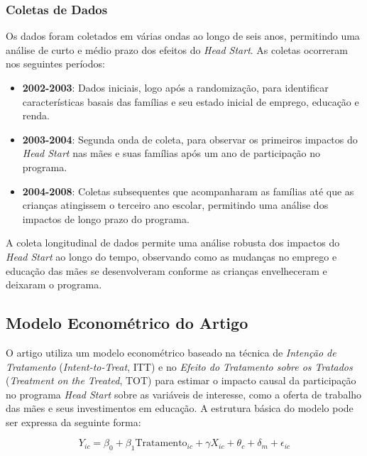 \documentclass[a4paper,12pt]{article}[abntex2]
\begin{document}
\subsubsection*{Coletas de Dados}

Os dados foram coletados em várias ondas ao longo de seis anos, permitindo uma análise de curto e médio prazo dos efeitos do \textit{Head Start}. As coletas ocorreram nos seguintes períodos:
\begin{itemize}
    \item \textbf{2002-2003}: Dados iniciais, logo após a randomização, para identificar características basais das famílias e seu estado inicial de emprego, educação e renda.
    \item \textbf{2003-2004}: Segunda onda de coleta, para observar os primeiros impactos do \textit{Head Start} nas mães e suas famílias após um ano de participação no programa.
    \item \textbf{2004-2008}: Coletas subsequentes que acompanharam as famílias até que as crianças atingissem o terceiro ano escolar, permitindo uma análise dos impactos de longo prazo do programa.
\end{itemize}

A coleta longitudinal de dados permite uma análise robusta dos impactos do \textit{Head Start} ao longo do tempo, observando como as mudanças no emprego e educação das mães se desenvolveram conforme as crianças envelheceram e deixaram o programa.
\subsection{\textbf{Modelo Econométrico do Artigo}}

O artigo utiliza um modelo econométrico baseado na técnica de \textit{Intenção de Tratamento} (\textit{Intent-to-Treat}, ITT) e no \textit{Efeito do Tratamento sobre os Tratados} (\textit{Treatment on the Treated}, TOT) para estimar o impacto causal da participação no programa \textit{Head Start} sobre as variáveis de interesse, como a oferta de trabalho das mães e seus investimentos em educação. A estrutura básica do modelo pode ser expressa da seguinte forma:

\begin{equation}
Y_{ic} = \beta_0 + \beta_1 \text{Tratamento}_{ic} + \gamma X_{ic} + \theta_c + \delta_m + \epsilon_{ic}
\end{equation}
\end{document}
